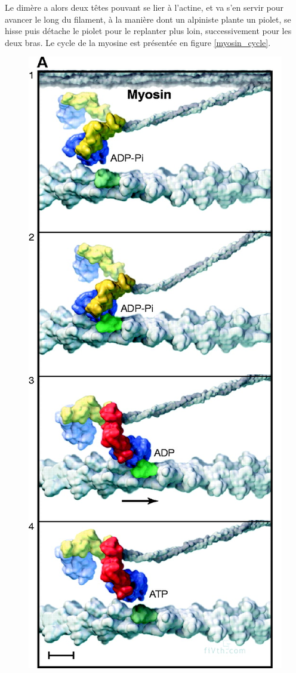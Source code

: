 Le dimère a alors deux têtes pouvant se lier à l'actine, et va s'en servir pour avancer le long du filament, à la manière dont un alpiniste plante un piolet, se hisse puis détache le piolet pour le replanter plus loin, successivement pour les deux bras. Le cycle de la myosine est présentée en figure \ref{myosin_cycle}. 

\begin{figure}
\includegraphics[scale=0.5]{Figures/Myosin.png} 

\end{figure}
